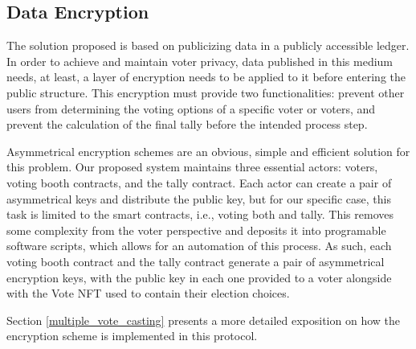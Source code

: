 \documentclass[../main.tex]{subfiles}
\begin{document}
    \subsection{Data Encryption}
        The solution proposed is based on publicizing data in a publicly accessible ledger. In order to achieve and maintain voter privacy, data published in this medium needs, at least, a layer of encryption needs to be applied to it before entering the public structure. This encryption must provide two functionalities: prevent other users from determining the voting options of a specific voter or voters, and prevent the calculation of the final tally before the intended process step.
        \par
        Asymmetrical encryption schemes are an obvious, simple and efficient solution for this problem. Our proposed system maintains three essential actors: voters, voting booth contracts, and the tally contract. Each actor can create a pair of asymmetrical keys and distribute the public key, but for our specific case, this task is limited to the smart contracts, i.e., voting both and tally. This removes some complexity from the voter perspective and deposits it into programable software scripts, which allows for an automation of this process. As such, each voting booth contract and the tally contract generate a pair of asymmetrical encryption keys, with the public key in each one provided to a voter alongside with the Vote NFT used to contain their election choices. 
        \par
        Section \ref{multiple_vote_casting} presents a more detailed exposition on how the encryption scheme is implemented in this protocol.
        
\end{document}
